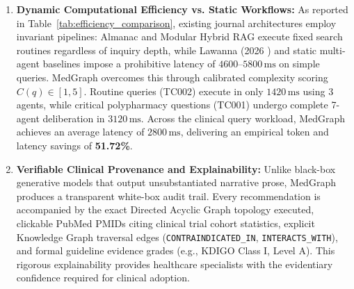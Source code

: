 \documentclass[conference]{IEEEtran}
\begin{document}
\begin{enumerate}
    \item \textbf{Dynamic Computational Efficiency vs. Static Workflows:}  
    As reported in Table~\ref{tab:efficiency_comparison}, existing journal architectures employ invariant pipelines: Almanac \cite{ZAKKA2024} and Modular Hybrid RAG \cite{info17020133} execute fixed search routines regardless of inquiry depth, while Lawanna (2026 \cite{LAWANNA2026100926}) and static multi-agent baselines impose a prohibitive latency of $4600\text{--}5800\,\text{ms}$ on simple queries. MedGraph overcomes this through calibrated complexity scoring $C(q) \in [1, 5]$. Routine queries (TC002) execute in only $1420\,\text{ms}$ using 3 agents, while critical polypharmacy questions (TC001) undergo complete 7-agent deliberation in $3120\,\text{ms}$. Across the clinical query workload, MedGraph achieves an average latency of $2800\,\text{ms}$, delivering an empirical token and latency savings of \textbf{51.72\%}.

    \item \textbf{Verifiable Clinical Provenance and Explainability:}  
    Unlike black-box generative models that output unsubstantiated narrative prose, MedGraph produces a transparent white-box audit trail. Every recommendation is accompanied by the exact Directed Acyclic Graph topology executed, clickable PubMed PMIDs citing clinical trial cohort statistics, explicit Knowledge Graph traversal edges (\texttt{CONTRAINDICATED\_IN}, \texttt{INTERACTS\_WITH}), and formal guideline evidence grades (e.g., KDIGO Class I, Level A). This rigorous explainability provides healthcare specialists with the evidentiary confidence required for clinical adoption.
\end{enumerate}

\FloatBarrier



\end{document}
